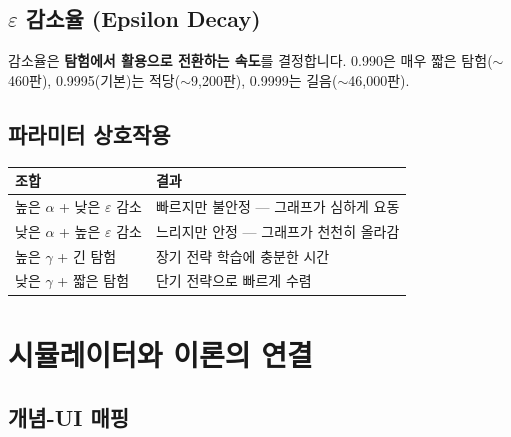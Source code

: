 \documentclass[11pt,a4paper]{article}
\begin{document}
\subsection{$\varepsilon$ 감소율 (Epsilon Decay)}

감소율은 \textbf{탐험에서 활용으로 전환하는 속도}를 결정합니다. 0.990은 매우 짧은 탐험($\sim$460판), 0.9995(기본)는 적당($\sim$9,200판), 0.9999는 길음($\sim$46,000판).

\subsection{파라미터 상호작용}

\begin{center}
\renewcommand{\arraystretch}{1.4}
\begin{tabular}{|l|p{8cm}|}
\hline
\rowcolor{tableheader}
\textbf{조합} & \textbf{결과} \\
\hline
높은 $\alpha$ + 낮은 $\varepsilon$ 감소 & 빠르지만 불안정 — 그래프가 심하게 요동 \\
\hline
낮은 $\alpha$ + 높은 $\varepsilon$ 감소 & 느리지만 안정 — 그래프가 천천히 올라감 \\
\hline
높은 $\gamma$ + 긴 탐험 & 장기 전략 학습에 충분한 시간 \\
\hline
낮은 $\gamma$ + 짧은 탐험 & 단기 전략으로 빠르게 수렴 \\
\hline
\end{tabular}
\end{center}

\section{시뮬레이터와 이론의 연결}

\subsection{개념-UI 매핑}
\end{document}
